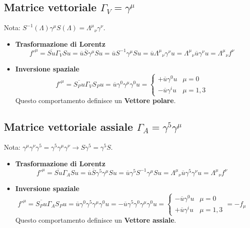 \subsection{Matrice vettoriale $\Gamma_V = \gamma^\mu$}
Nota: $S^{-1}(\Lambda)\gamma^\mu S(\Lambda) = {\Lambda^\mu}_\nu \gamma^\nu$.
\begin{itemize}
	\item \textbf{Trasformazione di Lorentz}
	\[
	f'^\mu = \overline{S u} \Gamma_V S u = \overline{u} \overline{S} \gamma^\mu S u = \overline{u} S^{-1} \gamma^\mu S u = \overline{u} {\Lambda^\mu}_\nu \gamma^\nu u = {\Lambda^\mu}_\nu \overline{u} \gamma^\nu u = {\Lambda^\mu}_\nu f^\nu
	\]
	\item \textbf{Inversione spaziale}
	\[
	f'^\mu = \overline{S_P u} \Gamma_V S_P u = \overline{u} \gamma^0 \gamma^\mu \gamma^0 u = 
	\begin{cases} 
		+\overline{u} \gamma^0 u & \mu = 0 \\ 
		-\overline{u} \gamma^i u & \mu = 1,3 
	\end{cases}
	\]
	Questo comportamento definisce un \textbf{Vettore polare}.
\end{itemize}

\subsection{Matrice vettoriale assiale $\Gamma_A = \gamma^5 \gamma^\mu$}
Nota: $\gamma^\mu \gamma^\nu \gamma^5 = \gamma^5 \gamma^\mu \gamma^\nu \rightarrow S \gamma^5 = \gamma^5 S$.
\begin{itemize}
	\item \textbf{Trasformazione di Lorentz}
	\[
	f'^\mu = \overline{S u} \Gamma_A S u = \overline{u} \overline{S} \gamma^5 \gamma^\mu S u = \overline{u} \gamma^5 S^{-1} \gamma^\mu S u = {\Lambda^\mu}_\nu \overline{u} \gamma^5 \gamma^\nu u = {\Lambda^\mu}_\nu f^\nu
	\]
	\item \textbf{Inversione spaziale}
	\[
	f'^\mu = \overline{S_P u} \Gamma_A S_P u = \overline{u} \gamma^0 \gamma^5 \gamma^\mu \gamma^0 u = -\overline{u} \gamma^5 \gamma^0 \gamma^\mu \gamma^0 u = 
	\begin{cases} 
		-\overline{u} \gamma^0 u & \mu = 0 \\ 
		+\overline{u} \gamma^i u & \mu = 1,3 
	\end{cases}
	= - f_\mu
	\]
	Questo comportamento definisce un \textbf{Vettore assiale}.
\end{itemize}
